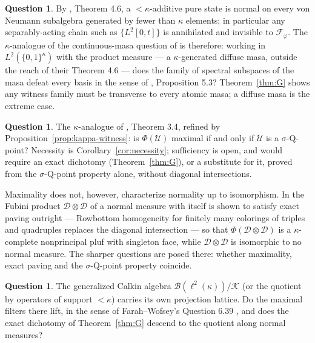 \documentclass[11pt,reqno]{amsart}
\theoremstyle{definition}
\newtheorem{question}[theorem]{Question}
\newcommand{\U}{\mathcal{U}}
\newcommand{\FF}{\mathcal{F}}
\newcommand{\Blk}{\mathcal{B}(\ell^2(\kappa))}
\begin{document}
\begin{question}\label{q:continuous}
By \cite{BlecherWeaver}, Theorem 4.6, a $<\kappa$-additive pure state is normal on
every von Neumann subalgebra generated by fewer than $\kappa$ elements; in particular
any separably-acting chain such as $\{L^2[0,t]\}$ is annihilated and invisible to
$\FF_\varphi$. The $\kappa$-analogue of the continuous-masa question of \cite{FWII} is
therefore: working in $L^2(\{0,1\}^\kappa)$ with the product measure --- a
$\kappa$-generated diffuse masa, outside the reach of their Theorem 4.6 --- does the
family of spectral subspaces of the masa defeat every basis in the sense of
\cite{FWII}, Proposition 5.3? Theorem~\ref{thm:G} shows any witness family must be
transverse to every atomic masa; a diffuse masa is the extreme case.
\end{question}

\begin{question}\label{q:kappaC}
The $\kappa$-analogue of \cite{FWII}, Theorem 3.4, refined by
Proposition~\ref{prop:kappa-witness}: is $\Phi(\U)$ maximal if and only if $\U$ is a
$\sigma$-Q-point? Necessity is Corollary~\ref{cor:necessity}; sufficiency is open, and
would require an exact dichotomy (Theorem~\ref{thm:G}), or a substitute for it, proved
from the $\sigma$-Q-point property alone, without diagonal intersections.

Maximality does not, however, characterize normality up to isomorphism. In
\cite{FWIV} the Fubini product $\mathcal D\otimes\mathcal D$ of a normal measure with
itself is shown to satisfy exact paving outright --- Rowbottom homogeneity for finitely
many colorings of triples and quadruples replaces the diagonal intersection --- so that
$\Phi(\mathcal D\otimes\mathcal D)$ is a $\kappa$-complete nonprincipal pluf with
singleton face, while $\mathcal D\otimes\mathcal D$ is isomorphic to no normal
measure. The sharper questions are posed there: whether maximality, exact paving and
the $\sigma$-Q-point property coincide.
\end{question}

\begin{question}\label{q:calkinkappa}
The generalized Calkin algebra $\Blk/\mathcal K$ (or the quotient by operators of
support $<\kappa$) carries its own projection lattice. Do the maximal filters there
lift, in the sense of Farah--Wofsey's Question 6.39 \cite{FarahWofsey}, and does the
exact dichotomy of Theorem~\ref{thm:G} descend to the quotient along normal measures?
\end{question}
\end{document}
